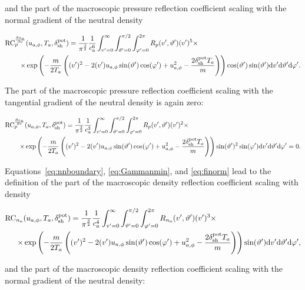 \noindent and the part of the macroscopic pressure reflection coefficient scaling with the normal gradient of the neutral density

\begin{align}
    \mathrm{RC}_{p}^{\frac{\partial n_\mathrm{n}}{\partial \nu}} & (u_{a,\phi},T_a,\delta_{\mathrm{sh}}^{\mathrm{pot}}) =
    \frac{1}{\pi^\frac{3}{2}} \frac{1}{c_a^6} \int_{v'=0}^{\infty} \int_{\vartheta'=0}^{\pi/2} \int_{\varphi'=0}^{2\pi}
    R_p(v',\vartheta') (v')^5 \times \nonumber \\
    \times & \exp \left( - \frac{m}{2 T_a} \left( (v')^2-2 (v') u_{a,\phi} \sin (\vartheta') \cos (\varphi') + u_{a,\phi}^2 - \frac{2 \delta_{\mathrm{sh}}^{\mathrm{pot}} T_a}{m} \right) \right)  \cos (\vartheta') \sin (\vartheta')
    \mathrm{d} v' \mathrm{d} \vartheta' \mathrm{d} \varphi'. \label{eq:rponetwoi_def}
\end{align}

\noindent The part of the macroscopic pressure reflection coefficient scaling with the tangential gradient of the neutral density is again zero:

\begin{align}
    \mathrm{RC}_{p}^{\frac{\partial n_\mathrm{n}}{\partial \tau}} & (u_{a,\phi},T_a,\delta_{\mathrm{sh}}^{\mathrm{pot}}) =
    \frac{1}{\pi^\frac{3}{2}} \frac{1}{c_a^3} \int_{v'=0}^{\infty} \int_{\vartheta'=0}^{\pi/2} \int_{\varphi'=0}^{2\pi}
    R_p(v',\vartheta') (v')^2 \times \nonumber \\
    \times & \exp \left( - \frac{m}{2 T_a} \left( (v')^2-2 (v') u_{a,\phi} \sin (\vartheta') \cos (\varphi') + u_{a,\phi}^2 - \frac{2 \delta_{\mathrm{sh}}^{\mathrm{pot}} T_a}{m} \right) \right)  \sin (\vartheta')^2 \sin (\varphi')
    \mathrm{d} v' \mathrm{d} \vartheta' \mathrm{d} \varphi' = 0.
\end{align}

\noindent Equations~\eqref{eq:nnboundary}, \eqref{eq:Gammanmin}, and \eqref{eq:finorm} lead to the definition of the part of the macroscopic density reflection coefficient scaling with density

\begin{align}
    \mathrm{RC}_{n_\mathrm{n}} & (u_{a,\phi},T_a,\delta_{\mathrm{sh}}^{\mathrm{pot}}) =
    \frac{1}{\pi^\frac{3}{2}} \frac{1}{c_a^4} \int_{v'=0}^{\infty} \int_{\vartheta'=0}^{\pi/2} \int_{\varphi'=0}^{2\pi}
    R_{n_{\mathrm{n}}}(v',\vartheta') (v')^3 \times \nonumber \\
    \times & \exp \left( - \frac{m}{2 T_a} \left( (v')^2-2 (v') u_{a,\phi} \sin (\vartheta') \cos (\varphi') + u_{a,\phi}^2 - \frac{2 \delta_{\mathrm{sh}}^{\mathrm{pot}} T_a}{m} \right) \right) \sin (\vartheta')
    \mathrm{d} v' \mathrm{d} \vartheta' \mathrm{d} \varphi', \label{eq:rptwoonei_def}
\end{align}

\noindent and the part of the macroscopic density reflection coefficient scaling with the normal gradient of the neutral density:

